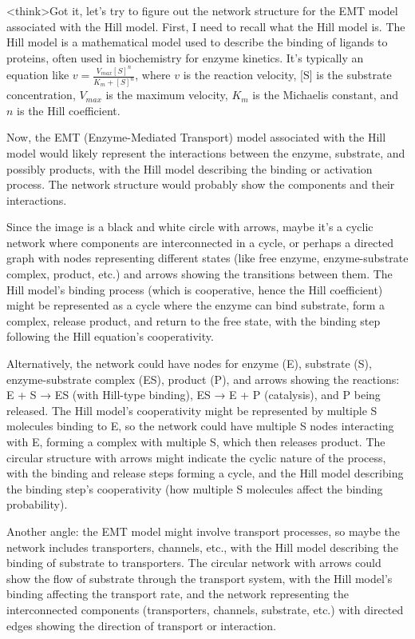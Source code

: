 <think>Got it, let's try to figure out the network structure for the EMT model associated with the Hill model. First, I need to recall what the Hill model is. The Hill model is a mathematical model used to describe the binding of ligands to proteins, often used in biochemistry for enzyme kinetics. It's typically an equation like \( v = \frac{V_{max}[S]^n}{K_m + [S]^n} \), where \( v \) is the reaction velocity, [S] is the substrate concentration, \( V_{max} \) is the maximum velocity, \( K_m \) is the Michaelis constant, and \( n \) is the Hill coefficient.

Now, the EMT (Enzyme-Mediated Transport) model associated with the Hill model would likely represent the interactions between the enzyme, substrate, and possibly products, with the Hill model describing the binding or activation process. The network structure would probably show the components and their interactions. 

Since the image is a black and white circle with arrows, maybe it's a cyclic network where components are interconnected in a cycle, or perhaps a directed graph with nodes representing different states (like free enzyme, enzyme-substrate complex, product, etc.) and arrows showing the transitions between them. The Hill model's binding process (which is cooperative, hence the Hill coefficient) might be represented as a cycle where the enzyme can bind substrate, form a complex, release product, and return to the free state, with the binding step following the Hill equation's cooperativity.

Alternatively, the network could have nodes for enzyme (E), substrate (S), enzyme-substrate complex (ES), product (P), and arrows showing the reactions: E + S → ES (with Hill-type binding), ES → E + P (catalysis), and P being released. The Hill model's cooperativity might be represented by multiple S molecules binding to E, so the network could have multiple S nodes interacting with E, forming a complex with multiple S, which then releases product. The circular structure with arrows might indicate the cyclic nature of the process, with the binding and release steps forming a cycle, and the Hill model describing the binding step's cooperativity (how multiple S molecules affect the binding probability).

Another angle: the EMT model might involve transport processes, so maybe the network includes transporters, channels, etc., with the Hill model describing the binding of substrate to transporters. The circular network with arrows could show the flow of substrate through the transport system, with the Hill model's binding affecting the transport rate, and the network representing the interconnected components (transporters, channels, substrate, etc.) with directed edges showing the direction of transport or interaction.

